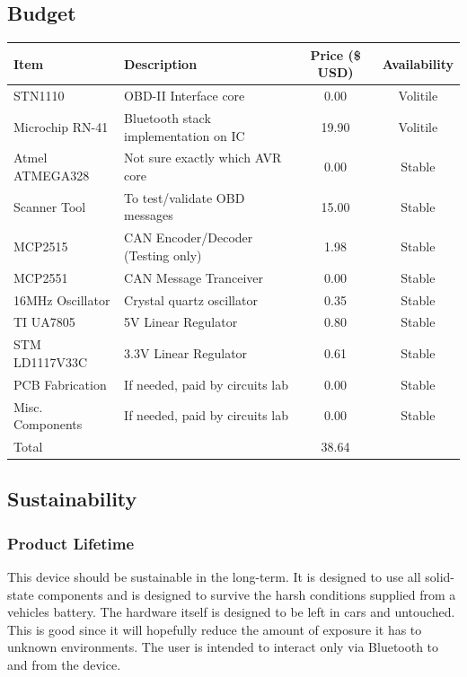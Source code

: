 \documentclass[12pt,letterpaper]{article}
\begin{document}
\subsection{Budget}
\begin{tabular}{| l | p{7cm} | c | c |}
\hline
Item & Description & Price (\$ USD) & Availability \\ \hline
STN1110 & OBD-II Interface core & 0.00& Volitile \\ \hline
Microchip RN-41 & Bluetooth stack implementation on IC & 19.90 & Volitile \\ \hline
Atmel ATMEGA328 & Not sure exactly which AVR core & 0.00 & Stable \\ \hline
Scanner Tool & To test/validate OBD messages & 15.00 & Stable\\ \hline
MCP2515 & CAN Encoder/Decoder (Testing only) & 1.98 & Stable\\ \hline
MCP2551 & CAN Message Tranceiver & 0.00 & Stable\\ \hline
16MHz Oscillator & Crystal quartz oscillator & 0.35 & Stable \\ \hline
TI UA7805 & 5V Linear Regulator & 0.80 & Stable \\ \hline
STM LD1117V33C & 3.3V Linear Regulator & 0.61 & Stable \\ \hline 
\hline
PCB Fabrication & If needed, paid by circuits lab & 0.00 & Stable\\ \hline
Misc. Components & If needed, paid by circuits lab & 0.00 & Stable\\ \hline
\hline
Total && 38.64 & \\ \hline
\end{tabular}

\subsection{Sustainability}
\subsubsection{Product Lifetime}
This device should be sustainable in the long-term. It is designed to use all solid-state components and is designed to survive the harsh conditions supplied from a vehicles battery. The hardware itself is designed to be left in cars and untouched. This is good since it will hopefully reduce the amount of exposure it has to unknown environments. The user is intended to interact only via Bluetooth to and from the device. 
\end{document}

